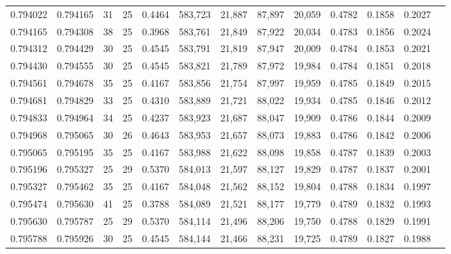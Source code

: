 \begin{tabular}{rrrrrrrrrrrrr}
0.794022 & 0.794165 &    31 &  25 &                                     0.4464 & 583,723 &  21,887 &  87,897 &  20,059 & 0.4782 & 0.1858 & 0.2027 \\
0.794165 & 0.794308 &    38 &  25 &                                     0.3968 & 583,761 &  21,849 &  87,922 &  20,034 & 0.4783 & 0.1856 & 0.2024 \\
0.794312 & 0.794429 &    30 &  25 &                                     0.4545 & 583,791 &  21,819 &  87,947 &  20,009 & 0.4784 & 0.1853 & 0.2021 \\
0.794430 & 0.794555 &    30 &  25 &                                     0.4545 & 583,821 &  21,789 &  87,972 &  19,984 & 0.4784 & 0.1851 & 0.2018 \\
0.794561 & 0.794678 &    35 &  25 &                                     0.4167 & 583,856 &  21,754 &  87,997 &  19,959 & 0.4785 & 0.1849 & 0.2015 \\
0.794681 & 0.794829 &    33 &  25 &                                     0.4310 & 583,889 &  21,721 &  88,022 &  19,934 & 0.4785 & 0.1846 & 0.2012 \\
0.794833 & 0.794964 &    34 &  25 &                                     0.4237 & 583,923 &  21,687 &  88,047 &  19,909 & 0.4786 & 0.1844 & 0.2009 \\
0.794968 & 0.795065 &    30 &  26 &                                     0.4643 & 583,953 &  21,657 &  88,073 &  19,883 & 0.4786 & 0.1842 & 0.2006 \\
0.795065 & 0.795195 &    35 &  25 &                                     0.4167 & 583,988 &  21,622 &  88,098 &  19,858 & 0.4787 & 0.1839 & 0.2003 \\
0.795196 & 0.795327 &    25 &  29 &                                     0.5370 & 584,013 &  21,597 &  88,127 &  19,829 & 0.4787 & 0.1837 & 0.2001 \\
0.795327 & 0.795462 &    35 &  25 &                                     0.4167 & 584,048 &  21,562 &  88,152 &  19,804 & 0.4788 & 0.1834 & 0.1997 \\
0.795474 & 0.795630 &    41 &  25 &                                     0.3788 & 584,089 &  21,521 &  88,177 &  19,779 & 0.4789 & 0.1832 & 0.1993 \\
0.795630 & 0.795787 &    25 &  29 &                                     0.5370 & 584,114 &  21,496 &  88,206 &  19,750 & 0.4788 & 0.1829 & 0.1991 \\
0.795788 & 0.795926 &    30 &  25 &                                     0.4545 & 584,144 &  21,466 &  88,231 &  19,725 & 0.4789 & 0.1827 & 0.1988 \\

\end{tabular}
